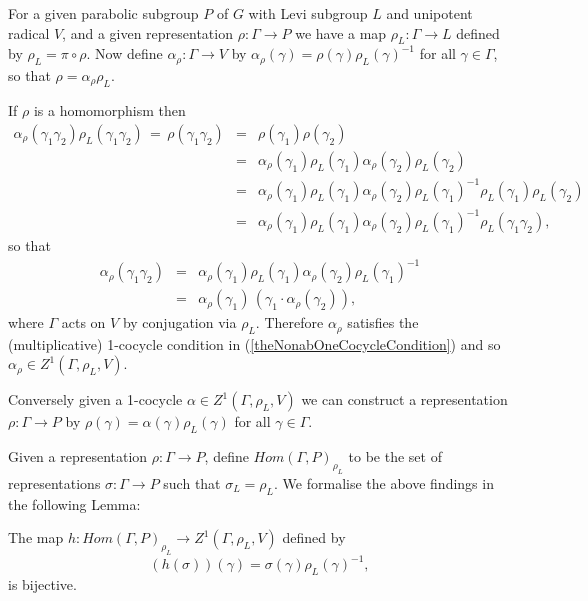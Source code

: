 For a given parabolic subgroup $P$ of $G$ with Levi subgroup $L$ and unipotent radical $V$, and a given representation $\rho:\Gamma\rightarrow P$ we have a map $\rho_L:\Gamma\rightarrow L$ defined by $\rho_L = \pi \circ \rho$. Now define $\alpha_\rho:\Gamma\rightarrow V$ by $\alpha_\rho(\gamma) = \rho(\gamma)\rho_L(\gamma)^{-1}$ for all $\gamma\in\Gamma$, so that $\rho = \alpha_\rho\rho_L$.

If $\rho$ is a homomorphism then
\begin{eqnarray*}
	\alpha_\rho(\gamma_1\gamma_2)\rho_L(\gamma_1\gamma_2) \,=\, \rho(\gamma_1\gamma_2) 
		&=& \rho(\gamma_1)\rho(\gamma_2) \\
		&=& \alpha_\rho(\gamma_1)\rho_L(\gamma_1)\alpha_\rho(\gamma_2)\rho_L(\gamma_2) \\
		&=& \alpha_\rho(\gamma_1)\rho_L(\gamma_1)\alpha_\rho(\gamma_2)\rho_L(\gamma_1)^{-1}\rho_L(\gamma_1)\rho_L(\gamma_2)\\
		&=&\alpha_\rho(\gamma_1)\rho_L(\gamma_1)\alpha_\rho(\gamma_2)\rho_L(\gamma_1)^{-1}\rho_L(\gamma_1\gamma_2),
\end{eqnarray*}
so that
\begin{eqnarray*}
	\alpha_\rho(\gamma_1\gamma_2) &=&
	\alpha_\rho(\gamma_1)\rho_L(\gamma_1)\alpha_\rho(\gamma_2)\rho_L(\gamma_1)^{-1}\\
	&=& \alpha_\rho(\gamma_1)\,\left(\gamma_1\cdot\alpha_\rho(\gamma_2)\right),
\end{eqnarray*}
where $\Gamma$ acts on $V$ by conjugation via $\rho_L$. Therefore $\alpha_\rho$ satisfies the (multiplicative) 1-cocycle condition in (\ref{theNonabOneCocycleCondition}) and so $\alpha_\rho\in Z^1(\Gamma, \rho_L, V)$. 

Conversely given a 1-cocycle $\alpha\in Z^1(\Gamma, \rho_L, V)$ we can construct a representation $\rho:\Gamma\rightarrow P$ by $\rho(\gamma) = \alpha(\gamma)\rho_L(\gamma)$ for all $\gamma\in \Gamma$.

Given a representation $\rho:\Gamma\rightarrow P$, define $Hom(\Gamma, P)_{\rho_L}$ to be the set of representations $\sigma:\Gamma\rightarrow P$ such that $\sigma_L = \rho_L$. We formalise the above findings in the following Lemma:

\begin{lemma}
  The map $h:Hom(\Gamma, P)_{\rho_L} \rightarrow Z^1(\Gamma, \rho_L, V)$ defined by
  \begin{displaymath}
    (h(\sigma))(\gamma) = \sigma(\gamma)\rho_L(\gamma)^{-1},
  \end{displaymath}
  is bijective.
  \label{lem:hom_z1}
\end{lemma}

